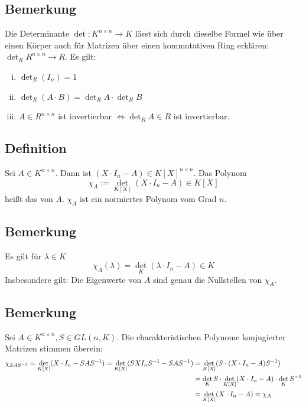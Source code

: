 \subsection[Bemerkung zur Definition der Determinante über einem Ring]{Bemerkung} %
\label{sub:61}
Die Determinante $\det : K^{n \times n} \to K$ lässt sich durch dieselbe Formel wie über einen Körper auch für Matrizen über einen kommutativen Ring erklären:
$ \det_R R^{n \times n} \to R$. Es gilt:
\begin{enumerate}[(i)]
	\item $\det_R ( I_n) = 1$
	\item $\det_R (A \cdot B) =\det_R A \cdot \det_R B$
	\item $A \in R^{n \times n}$ ist invertierbar $\iff \det_R A \in R$ ist invertierbar. 
\end{enumerate}

\subsection[Definition charakteristisches Polynom]{Definition} %
\label{sub:62}
Sei $A \in K^{n \times n}$. Dann ist $( X \cdot I_n - A) \in K[X]^{n \times n}$. Das Polynom 
\[
	\chi_A := \det_{K[X]} (X \cdot I_n -A) \in K[X]
\]
heißt das  von $A$. $\chi_A$ ist ein normiertes Polynom vom Grad $n$. 

\subsection[Bemerkung, dass die Nullstellen mit den Eigenwerten übereinstimmen]{Bemerkung} %
\label{sub:63}
Es gilt für $\lambda \in K$
\[
	\chi_A(\lambda ) = \det_K (\lambda \cdot I_n - A) \in K
\]
Insbesondere gilt: Die Eigenwerte von $A$ sind genau die Nullstellen von $\chi_A$.

\subsection[Bemerkung über die Gleichheit der charakteristischen Polynome konjugierter Matrizen]{Bemerkung} %
\label{sub:64}
Sei $A \in K^{n \times n}, S \in GL(n,K)$. Die charakteristischen Polynome konjugierter Matrizen stimmen überein:
\begin{align*}
	\chi_{SAS ^{-1}} = \det_{K[X]} (X \cdot I_n - SAS ^{-1}) = \det_{K[X]} (S X I_n S ^{-1} - S A S ^{-1}) &= \det_{K[X]} 
	(S \cdot ( X \cdot I_n -A) S ^{-1}) \\
	&= \det_K S \cdot \det_{K[X]} (X \cdot I_n -A) \cdot \det_{K} S ^{-1} \\
	&= \det_{K[X]} (X \cdot  I_n -A) = \chi_A
\end{align*}

